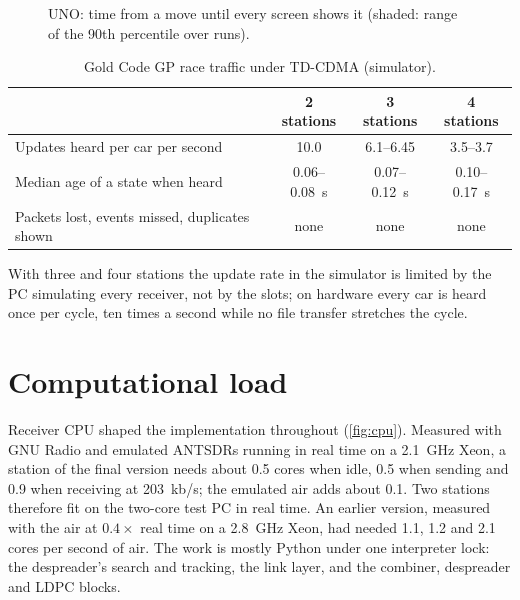 \documentclass[11pt,a4paper,oneside]{report}
\begin{document}
\begin{figure}[htbp]
\centering
{}
\caption{UNO: time from a move until every screen shows it (shaded: range of the 90th percentile over runs).}\label{fig:uno}
\end{figure}

\begin{table}[htbp]
\centering\small
\caption{Gold Code GP race traffic under TD-CDMA (simulator).}\label{tab:race}
\begin{tabular}{@{}lccc@{}}
\toprule
 & \textbf{2 stations} & \textbf{3 stations} & \textbf{4 stations}\\
\midrule
Updates heard per car per second & 10.0 & 6.1--6.45 & 3.5--3.7\\
Median age of a state when heard & 0.06--\SI{0.08}{s} & 0.07--\SI{0.12}{s} & 0.10--\SI{0.17}{s}\\
Packets lost, events missed, duplicates shown & none & none & none\\
\bottomrule
\end{tabular}
\end{table}

With three and four stations the update rate in the simulator is limited by the PC simulating every
receiver, not by the slots; on hardware every car is heard once per cycle, ten times a second while no
file transfer stretches the cycle.

\section{Computational load}\label{sec:cpu}
Receiver CPU shaped the implementation throughout (\cref{fig:cpu}). Measured with GNU Radio and emulated
ANTSDRs running in real time on a \SI{2.1}{GHz} Xeon, a station of the final version needs about 0.5
cores when idle, 0.5 when sending and 0.9 when receiving at \SI{203}{kb/s}; the emulated air adds about
0.1. Two stations therefore fit on the two-core test PC in real time. An earlier version, measured with
the air at $0.4\times$ real time on a \SI{2.8}{GHz} Xeon, had needed 1.1, 1.2 and 2.1 cores per second of
air. The work is mostly Python under one interpreter lock: the despreader's search and tracking, the
link layer, and the combiner, despreader and LDPC blocks.
\end{document}
